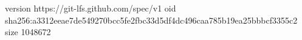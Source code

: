version https://git-lfs.github.com/spec/v1
oid sha256:a3312eeae7de549270bcc5fe2fbc33d5df4dc496caa785b19ea25bbbcf3355c2
size 1048672
